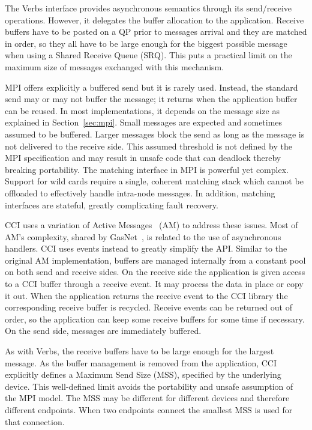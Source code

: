 The Verbs interface provides asynchronous semantics through its send/receive
operations. However, it delegates the buffer allocation to the application. 
Receive buffers have to be posted on a QP prior to messages arrival 
and they are matched in order, so they all have to be large enough for the 
biggest possible message when using a Shared Receive Queue (SRQ). 
This puts a practical limit on the maximum size of messages exchanged with 
this mechanism.

MPI offers explicitly a buffered send but it is rarely used. Instead, the 
standard send may or may not buffer the message; it returns when 
the application buffer can be reused. In most implementations, it 
depends on the message size as explained in Section~\ref{sec:mpi}. 
Small messages are expected and sometimes assumed to be buffered. Larger 
messages block the send as long as the message is not delivered to the receive 
side. This assumed threshold is not defined by the MPI 
specification and may result in unsafe code that can deadlock thereby breaking 
portability. 
The matching interface in MPI is powerful yet complex. Support 
for wild cards require a single, coherent matching stack which cannot be 
offloaded to effectively handle intra-node messages. In addition, matching 
interfaces are stateful,  greatly complicating fault recovery.

CCI uses a variation of Active Messages~\cite{voneicken-isca92} (AM) 
to address these issues. 
Most of AM's complexity, shared by GasNet~\cite{gasnet}, is related 
to the use of asynchronous handlers. CCI uses events instead to greatly 
simplify the API. Similar to the original AM implementation, buffers are managed 
internally from a constant pool on both send and receive sides. 
On the receive side the application is given access to a CCI buffer through 
a receive event. It may process the data in place or copy it out. When the 
application returns the receive event to the CCI library the corresponding 
receive buffer is recycled. Receive events can be returned out of order, so 
the application can keep some receive buffers for some time if necessary. 
On the send side, messages are immediately buffered.

As with Verbs, the receive buffers have to be large enough for the largest 
message. As the buffer management is removed from the application, CCI 
explicitly defines a Maximum Send Size (MSS), specified by the underlying  
device. This well-defined limit avoids the portability and unsafe assumption 
of the MPI model. The MSS may be different for 
different devices and therefore different endpoints. When two endpoints 
connect the smallest MSS is used for that connection.

